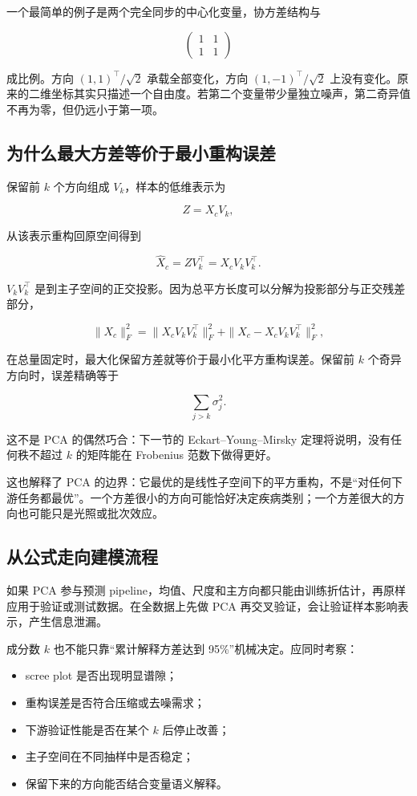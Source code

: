 一个最简单的例子是两个完全同步的中心化变量，协方差结构与

\[
\begin{pmatrix}
1&1\\
1&1
\end{pmatrix}
\]

成比例。方向 \((1,1)^\top/\sqrt2\) 承载全部变化，方向 \((1,-1)^\top/\sqrt2\) 上没有变化。原来的二维坐标其实只描述一个自由度。若第二个变量带少量独立噪声，第二奇异值不再为零，但仍远小于第一项。

\subsection{为什么最大方差等价于最小重构误差}

保留前 \(k\) 个方向组成 \(V_k\)，样本的低维表示为

\[
Z=X_cV_k,
\]

从该表示重构回原空间得到

\[
\widehat X_c=ZV_k^\top=X_cV_kV_k^\top.
\]

\(V_kV_k^\top\) 是到主子空间的正交投影。因为总平方长度可以分解为投影部分与正交残差部分，

\[
\|X_c\|_F^2
=\|X_cV_kV_k^\top\|_F^2
+\|X_c-X_cV_kV_k^\top\|_F^2,
\]

在总量固定时，最大化保留方差就等价于最小化平方重构误差。保留前 \(k\) 个奇异方向时，误差精确等于

\[
\sum_{j>k}\sigma_j^2.
\]

这不是 PCA 的偶然巧合：下一节的 Eckart--Young--Mirsky 定理将说明，没有任何秩不超过 \(k\) 的矩阵能在 Frobenius 范数下做得更好。

这也解释了 PCA 的边界：它最优的是线性子空间下的平方重构，不是``对任何下游任务都最优''。一个方差很小的方向可能恰好决定疾病类别；一个方差很大的方向也可能只是光照或批次效应。

\subsection{从公式走向建模流程}

如果 PCA 参与预测 pipeline，均值、尺度和主方向都只能由训练折估计，再原样应用于验证或测试数据。在全数据上先做 PCA 再交叉验证，会让验证样本影响表示，产生信息泄漏。

成分数 \(k\) 也不能只靠``累计解释方差达到 95\%''机械决定。应同时考察：

\begin{itemize}
\tightlist
\item
  scree plot 是否出现明显谱隙；
\item
  重构误差是否符合压缩或去噪需求；
\item
  下游验证性能是否在某个 \(k\) 后停止改善；
\item
  主子空间在不同抽样中是否稳定；
\item
  保留下来的方向能否结合变量语义解释。
\end{itemize}

